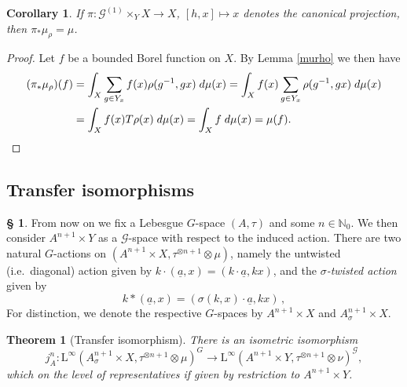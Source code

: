\documentclass[11pt, oneside]{amsart}
\newtheorem{thm}[lemma]{Theorem}
\newtheorem{cor}[lemma]{Corollary}
\theoremstyle{definition}
\newtheorem{no}[lemma]{\S}
\theoremstyle{remark}
\theoremstyle{TheoremNum}
\newcommand{\Linf}{\mathrm{L}^{\infty}}
\newcommand{\cG}{\mathcal{G}}
\newcommand{\bN}{\mathbb N}
\begin{document}
 \begin{cor}\label{PushRhoAway} If $\pi:  \mathcal{G}^{(1)}\times_Y X \to X$, $[h,x]  \mapsto x$ denotes the canonical projection, then $\pi_*\mu_{\rho} = \mu$.
\end{cor}
\begin{proof} Let $f$ be a bounded Borel function on $X$. By Lemma \ref{murho} we then have
\begin{align*}
(\pi_*\mu_\rho)(f) &=  \int_X \sum_{g \in Y_x} f(x)  \rho(g^{-1}, gx)\; d \mu(x) = \int_X f(x)  \sum_{g \in Y_x} \rho(g^{-1}, gx)\; d \mu(x)\\
&= \int_X f(x) T\rho(x) \; d\mu(x) =  \int_X f \; d \mu(x) = \mu(f).\qedhere
\end{align*}
\end{proof}

\subsection{Transfer isomorphisms}\label{sec:isomo}
\begin{no}\label{TwistedAction} From now on we fix a Lebesgue $G$-space $(A,\tau)$ and some $n \in \bN_0$. We then consider $A^{n+1} \times Y$ as a $\cG$-space with respect to the induced action.
There are two natural $G$-actions on $(A^{n+1} \times X,\tau^{\otimes n+1}\otimes \mu)$, namely the untwisted (i.e.\ diagonal) action given by
$k\cdot (\underline{a},x)=(k\cdot \underline{a},kx)$, and the \emph{$\sigma$-twisted action} given by
\begin{equation}\label{eq:twisted:action}
k\ast (\underline{a},x)=(\sigma(k,x)\cdot \underline{a},kx)\,,
\end{equation}
For distinction, we denote the respective $G$-spaces by $A^{n+1} \times X$ and $A_{\sigma}^{n+1} \times X$.
\end{no}
\begin{thm}[Transfer isomorphism]\label{BanachIso} There is an isometric isomorphism
\[
j^{n}_A: \Linf(A_\sigma^{n+1} \times X, \tau^{\otimes n+1}\otimes \mu)^G \to \Linf(A^{n+1} \times Y, \tau^{\otimes n+1}\otimes \nu)^{\cG},
\]
which on the level of representatives if given by restriction to $A^{n+1} \times Y$.
\end{thm}
\end{document}
